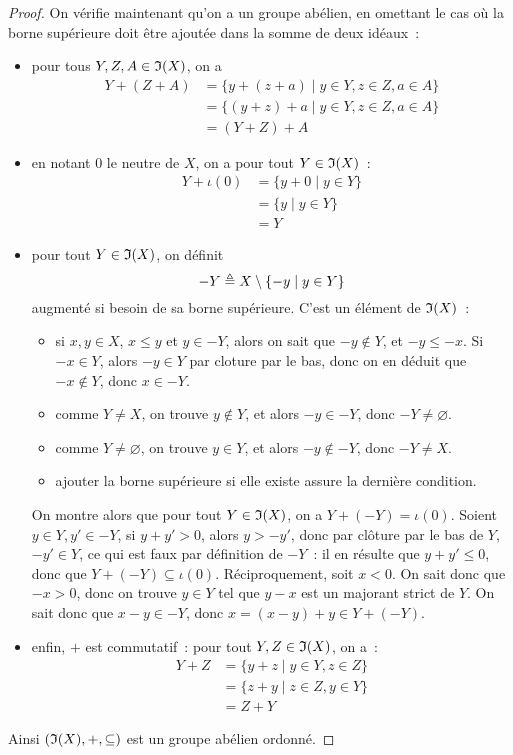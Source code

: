 \begin{proof}
  On vérifie maintenant qu'on a un groupe abélien, en omettant le cas où la
  borne supérieure doit être ajoutée dans la somme de deux idéaux~:
  \begin{itemize}
  \item pour tous $Y,Z,A\in\mathfrak{I}(X)$, on a
    \begin{align*}
      Y + (Z + A) &= \{ y + (z + a) \mid y \in Y, z \in Z, a \in A\}\\
      &= \{ (y + z) + a \mid y \in Y, z \in Z, a \in A\}\\
      &= (Y + Z) + A
    \end{align*}
  \item en notant $0$ le neutre de $X$, on a pour tout $Y \in \mathfrak{I}(X)$~:
    \begin{align*}
      Y + \iota(0) &= \{ y + 0 \mid y \in Y \}\\
      &= \{y \mid y \in Y \}\\
      &= Y
    \end{align*}
  \item pour tout $Y\in \mathfrak{I}(X)$, on définit
    \[-Y \triangleq X \setminus \{ - y \mid y \in Y \}\]
    augmenté si besoin de sa borne supérieure. C'est un élément de $\mathfrak{I}(X)$~:
    \begin{itemize}
    \item si $x,y \in X$, $x\leq y$ et $y \in -Y$, alors on sait que
      $-y\notin Y$, et $-y \leq -x$. Si $-x \in Y$, alors $-y \in Y$ par cloture
      par le bas, donc on en déduit que $-x \notin Y$, donc $x \in -Y$.
    \item comme $Y \neq X$, on trouve $y\notin Y$, et alors $-y \in -Y$, donc
      $-Y\neq \varnothing$.
    \item comme $Y \neq \varnothing$, on trouve $y\in Y$, et alors
      $-y \notin -Y$, donc $-Y\neq X$.
    \item ajouter la borne supérieure si elle existe assure la dernière
      condition.
    \end{itemize}
    On montre alors que pour tout $Y \in \mathfrak{I}(X)$, on a
    $Y + (-Y) = \iota(0)$. Soient $y\in Y, y' \in -Y$, si $y + y' > 0$, alors
    $y > - y'$, donc par clôture par le bas de $Y$, $-y' \in Y$, ce qui est
    faux par définition de $-Y$~: il en résulte que $y + y' \leq 0$, donc que
    $Y + (-Y) \subseteq \iota(0)$. Réciproquement, soit $x < 0$. On sait donc
    que $-x > 0$, donc on trouve $y \in Y$ tel que $y - x$ est un majorant
    strict de $Y$. On sait donc que $x - y \in - Y$, donc
    $x = (x - y) + y \in Y + (-Y)$.
  \item enfin, $+$ est commutatif~: pour tout $Y,Z \in \mathfrak{I}(X)$, on a~:
    \begin{align*}
      Y + Z &= \{ y + z \mid y \in Y, z \in Z \}\\
      &= \{ z + y \mid z \in Z, y \in Y \}\\
      &= Z + Y
    \end{align*}
  \end{itemize}
  Ainsi $(\mathfrak{I}(X),+,\subseteq)$ est un groupe abélien ordonné.
\end{proof}

